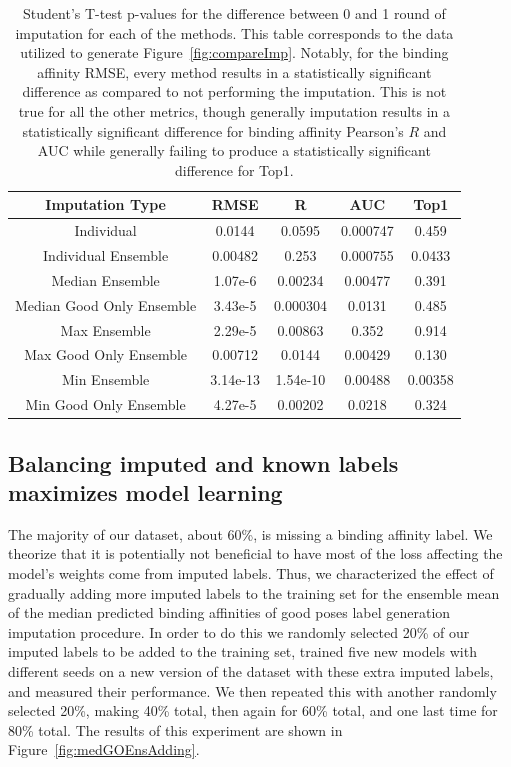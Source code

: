 \documentclass[journal=jcim,manuscript=article]{achemso}
\begin{document}
\begin{table}
    \centering
    \begin{tabular}{c|c|c|c|c}
    Imputation Type & RMSE & R & AUC & Top1 \\
    \hline
    Individual & 0.0144 & 0.0595 & 0.000747 & 0.459 \\
    Individual  Ensemble & 0.00482 & 0.253 & 0.000755 & 0.0433 \\
    Median Ensemble & 1.07e-6 & 0.00234 & 0.00477 & 0.391 \\
    Median Good Only Ensemble & 3.43e-5 & 0.000304 & 0.0131 & 0.485 \\
    Max Ensemble & 2.29e-5 & 0.00863 & 0.352 & 0.914 \\
    Max Good Only Ensemble & 0.00712 & 0.0144 & 0.00429 & 0.130 \\
    Min Ensemble & 3.14e-13 & 1.54e-10 & 0.00488 & 0.00358 \\
    Min Good Only Ensemble & 4.27e-5 & 0.00202 & 0.0218 & 0.324 \\
    \end{tabular}
    \caption{Student's T-test p-values for the difference between 0 and 1 round of imputation for each of the methods. This table corresponds to the data utilized to generate Figure~\ref{fig:compareImp}. Notably, for the binding affinity RMSE, every method results in a statistically significant difference as compared to not performing the imputation. This is not true for all the other metrics, though generally imputation results in a statistically significant difference for binding affinity Pearson's $R$ and AUC while generally failing to produce a statistically significant difference for Top1.}
    \label{tab:ImpTypeSignificance}
\end{table}

\subsection{Balancing imputed and known labels maximizes model learning}
The majority of our dataset, about 60\%, is missing a binding affinity label.
We theorize that it is potentially not beneficial to have most of the loss affecting the model's weights come from imputed labels.
Thus, we characterized the effect of gradually adding more imputed labels to the training set for the ensemble mean of the median predicted binding affinities of good poses label generation imputation procedure.
In order to do this we randomly selected 20\% of our imputed labels to be added to the training set, trained five new models with different seeds on a new version of the dataset with these extra imputed labels, and measured their performance.
We then repeated this with another randomly selected 20\%, making 40\% total, then again for 60\% total, and one last time for 80\% total.
The results of this experiment are shown in Figure~\ref{fig:medGOEnsAdding}.
\end{document}
